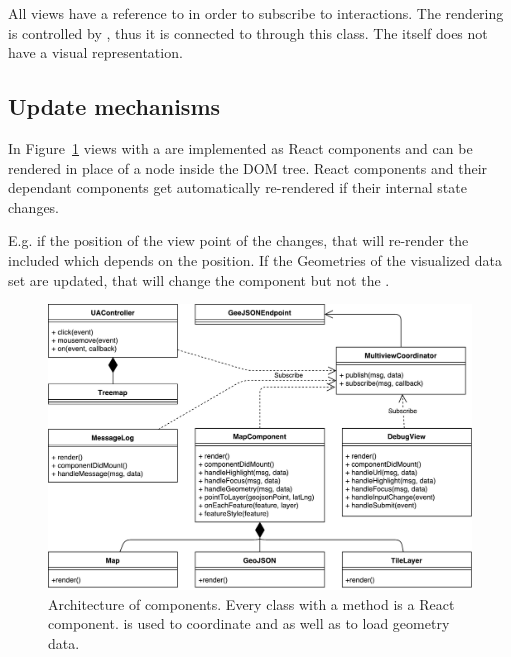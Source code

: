 All views have a reference to  in order to subscribe to interactions.
The rendering \tmap{} is controlled by , thus it is connected to  through this class.
The  itself does not have a visual representation.

\subsection{Update mechanisms}
In Figure~\ref{fig:implementation:architecture} views with a  are implemented as React components and can be rendered in place of a node inside the DOM tree.
React components and their dependant components get automatically re-rendered if their internal state changes.

E.g. if the position of the view point of the  changes, that will re-render the included  which depends on the position.
If the Geometries of the visualized data set are updated, that will change the  component but not the .



\begin{figure}[ht]
  \centering
  \caption{%
    Architecture of components.
    Every class with a  method is a React component.
     is used to coordinate \tmap{} and \gv{} as well as to load geometry data.
  }\label{fig:implementation:architecture}
  \includegraphics[width=\textwidth]{figures/implementation/Architecture.pdf}
\end{figure}

